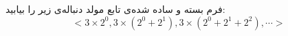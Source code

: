 \p
فرم بسته و ساده شده‌ی تابع مولد دنباله‌ی زیر را بیابید:
$$< 3\times2^0, 3\times(2^0 + 2^1), 3\times(2^0 + 2^1 + 2^2), \cdots >$$
